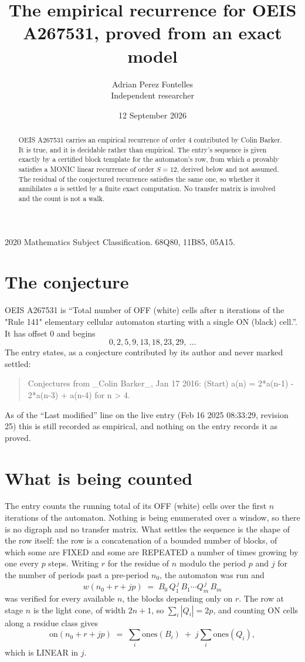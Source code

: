 \documentclass[11pt,a4paper]{article}
\title{The empirical recurrence for OEIS A267531, proved from an exact model}
\author{Adrian Perez Fontelles\\ \small Independent researcher}
\date{12 September 2026}
\theoremstyle{plain}
\theoremstyle{definition}
\begin{document}
\maketitle

\begin{abstract}
OEIS A267531 carries an empirical recurrence of order $4$ contributed by Colin Barker. It is true, and it is
decidable rather than empirical. The entry's sequence is given exactly by a certified block template for the automaton's row, from
which $a$ provably satisfies a MONIC linear recurrence of order $S=12$, derived below and not
assumed. The residual of the conjectured recurrence satisfies the same one, so whether it
annihilates $a$ is settled by a finite exact computation. No transfer matrix is involved and
the count is not a walk.
\end{abstract}

\noindent\small 2020 Mathematics Subject Classification. 68Q80, 11B85, 05A15.\normalsize

\section{The conjecture}

OEIS A267531 is ``Total number of OFF (white) cells after n iterations of the "Rule 141" elementary cellular automaton starting with a single ON (black) cell.''. It has offset $0$ and begins
\[
0, 2, 5, 9, 13, 18, 23, 29,\ \dots
\]
The entry states, as a conjecture contributed by its author and never marked settled:
\begin{quote}
Conjectures from \_Colin Barker\_, Jan 17 2016: (Start) a(n) = 2*a(n-1) - 2*a(n-3) + a(n-4) for n > 4.
\end{quote}
As of the ``Last modified'' line on the live entry (Feb 16 2025 08:33:29, revision 25)
this is still recorded as empirical, and nothing on the entry records it as proved.

\section{What is being counted}

The entry counts the running total of its OFF (white) cells over the first $n$ iterations of the automaton. Nothing is being enumerated over a window, so there is
no digraph and no transfer matrix. What settles the sequence is the shape of the row itself:
the row is a concatenation of a bounded number of blocks, of which some are
FIXED and some are REPEATED a number of times growing by one every $p$ steps. Writing $r$ for
the residue of $n$ modulo the period $p$ and $j$ for the number of periods past a pre-period
$n_0$, the automaton was run and
\[
w(n_0 + r + jp)\;=\;B_0\,Q_1^{\,j}\,B_1\cdots Q_m^{\,j}\,B_m
\]
was verified for every available $n$, the blocks depending only on $r$. The
row at stage $n$ is the light cone, of width $2n+1$, so $\sum_i|Q_i|=2p$, and counting ON
cells along a residue class gives
\[
\mathrm{on}(n_0+r+jp)\;=\;\sum_i \mathrm{ones}(B_i)\;+\;j\sum_i \mathrm{ones}(Q_i),
\]
which is LINEAR in $j$.
\end{document}
